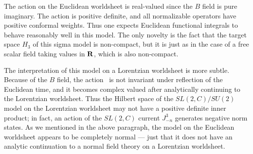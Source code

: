 The action on the Euclidean worldsheet is real-valued
since the $B$ field is pure imaginary. The action is
positive definite, and all normalizable operators have positive
conformal weights.
Thus one expects Euclidean functional integrals
to behave reasonably well  in this model. The only novelty
is the fact that the target space $H_3$ of this sigma
model is non-compact, but it is just as in the case of
a free scalar field taking values in ${\bf R}$, which
is also non-compact.

The  interpretation of this model on a Lorentzian
worldsheet is more subtle. Because of the $B$ field,
the action \lagrangian \ is not invariant under
reflection of the Euclidean time, and it becomes
complex valued after analytically continuing to
the Lorentzian worldsheet. Thus the Hilbert space
of the $SL(2,C)/SU(2)$ model
on the Lorentzian worldsheet may not have a positive
definite inner product; in fact, an action of
the $SL(2,C)$ current $J_{-n}^3$ generates
negative norm states. As we mentioned in the above
paragraph, the model
on the Euclidean worldsheet appears to be completely
normal --- just that it does not have an analytic
continuation to a normal field theory on a
Lorentzian worldsheet.


